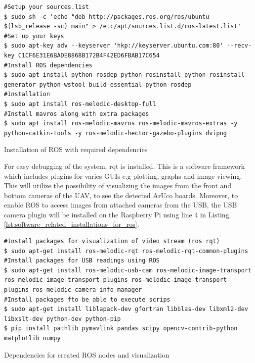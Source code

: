 \documentclass[../Head/report.tex]{subfiles}
\begin{document}
\begin{listing}[H] 
\begin{tcolorbox}[
    enhanced,
    attach boxed title to top left={xshift=6mm,yshift=-3mm},
    colback=lightgreen!20,
    colframe=lightgreen,
    fonttitle=\bfseries\color{black},
]
\begin{verbatim}
#Setup your sources.list
$ sudo sh -c 'echo "deb http://packages.ros.org/ros/ubuntu $(lsb_release -sc) main" > /etc/apt/sources.list.d/ros-latest.list'
#Set up your keys
$ sudo apt-key adv --keyserver 'hkp://keyserver.ubuntu.com:80' --recv-key C1CF6E31E6BADE8868B172B4F42ED6FBAB17C654
#Install ROS dependencies 
$ sudo apt install python-rosdep python-rosinstall python-rosinstall-generator python-wstool build-essential python-rosdep
#Installation
$ sudo apt install ros-melodic-desktop-full
#Install mavros along with extra packages
$ sudo apt install ros-melodic-mavros ros-melodic-mavros-extras -y python-catkin-tools -y ros-melodic-hector-gazebo-plugins dvipng
\end{verbatim}
\end{tcolorbox}
\caption{Installation of ROS with required dependencies}
\label{lst:ros_installation}    
\end{listing}   

For easy debugging of the system, rqt is installed. This is a software framework which includes plugins for varies GUIs e.g plotting, graphs and image viewing. This will utilize the possibility of visualizing the images from the front and bottom cameras of the UAV, to see the detected ArUco boards. Moreover, to enable ROS to access images from attached cameras from the USB, the USB camera plugin will be installed on the Raspberry Pi using line 4 in Listing \ref{lst:software_related_installations_for_ros}.  

\begin{listing}[H] 
\begin{tcolorbox}[
    enhanced,
    attach boxed title to top left={xshift=6mm,yshift=-3mm},
    colback=lightgreen!20,
    colframe=lightgreen,
    fonttitle=\bfseries\color{black},
]
\begin{verbatim}
#Install packages for visualization of video stream (ros rqt)
$ sudo apt-get install ros-melodic-rqt ros-melodic-rqt-common-plugins
#Install packages for USB readings using ROS
$ sudo apt-get install ros-melodic-usb-cam ros-melodic-image-transport ros-melodic-image-transport-plugins ros-melodic-image-transport-plugins ros-melodic-camera-info-manager
#Install packages fto be able to execute scrips
$ sudo apt-get install liblapack-dev gfortran libblas-dev libxml2-dev libxslt-dev python-dev python-pip
$ pip install pathlib pymavlink pandas scipy opencv-contrib-python matplotlib numpy
\end{verbatim}
\end{tcolorbox}
\caption{Dependencies for created ROS nodes and visualization}
\label{lst:software_related_installations_for_ros}    
\end{listing}   
\end{document}
